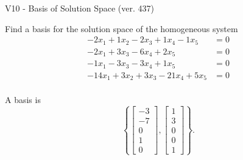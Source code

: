 \begin{exercise}
  \begin{exerciseTitle}V10 - Basis of Solution Space (ver. 437)\end{exerciseTitle}
  \begin{exerciseStatement}
    Find a basis for the solution space of the homogeneous system 
\begin{align*}
 -2 x_ 1 + 1 x_ 2 -2 x_ 3 + 1 x_ 4 -1 x_ 5 &= 0  \\ 
  -2 x_ 1 + 3 x_ 3 -6 x_ 4 + 2 x_ 5 &= 0  \\ 
  -1 x_ 1 -3 x_ 3 -3 x_ 4 + 1 x_ 5 &= 0  \\ 
  -14 x_ 1 + 3 x_ 2 + 3 x_ 3 -21 x_ 4 + 5 x_ 5 &= 0  \\ 
 \end{align*}


 
  \end{exerciseStatement}

  \begin{exerciseAnswer}
   A basis is   
\[\left\{\left[\begin{array}{c}
-3 \\
-7 \\
0 \\
1 \\
0
\end{array}\right] , \left[\begin{array}{c}
1 \\
3 \\
0 \\
0 \\
1
\end{array}\right]\right\}.\]

  


  \end{exerciseAnswer}
\end{exercise}